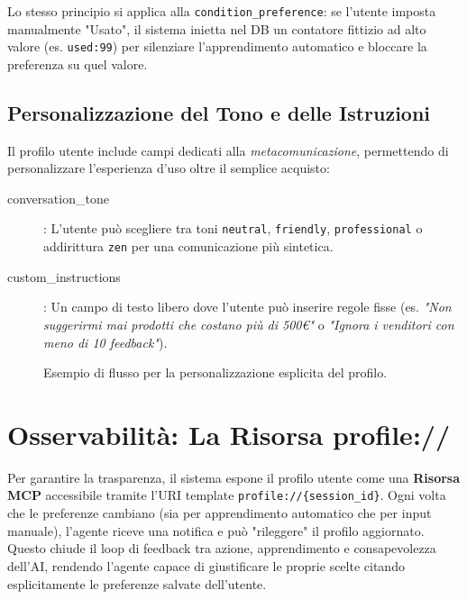 Lo stesso principio si applica alla \texttt{condition\_preference}: se l'utente imposta manualmente "Usato", il sistema inietta nel DB un contatore fittizio ad alto valore (es. \texttt{used:99}) per silenziare l'apprendimento automatico e bloccare la preferenza su quel valore.

\subsection{Personalizzazione del Tono e delle Istruzioni}
\label{subsec:profiling-tone}

Il profilo utente include campi dedicati alla \emph{metacomunicazione}, permettendo di personalizzare l'esperienza d'uso oltre il semplice acquisto:
\begin{description}
    \item[conversation\_tone]: L'utente può scegliere tra toni \texttt{neutral}, \texttt{friendly}, \texttt{professional} o addirittura \texttt{zen} per una comunicazione più sintetica.
    \item[custom\_instructions]: Un campo di testo libero dove l'utente può inserire regole fisse (es. \textit{"Non suggerirmi mai prodotti che costano più di 500€"} o \textit{"Ignora i venditori con meno di 10 feedback"}).
\end{description}

\begin{figure}[htbp]
    \centering
    \caption{Esempio di flusso per la personalizzazione esplicita del profilo.}
    \label{fig:profiling-update-tool}
\end{figure}

\section{Osservabilità: La Risorsa profile://}
\label{sec:profiling-resource}

Per garantire la trasparenza, il sistema espone il profilo utente come una \textbf{Risorsa MCP} accessibile tramite l'URI template \texttt{profile://\{session\_id\}}. Ogni volta che le preferenze cambiano (sia per apprendimento automatico che per input manuale), l'agente riceve una notifica e può "rileggere" il profilo aggiornato. Questo chiude il loop di feedback tra azione, apprendimento e consapevolezza dell'AI, rendendo l'agente capace di giustificare le proprie scelte citando esplicitamente le preferenze salvate dell'utente.

